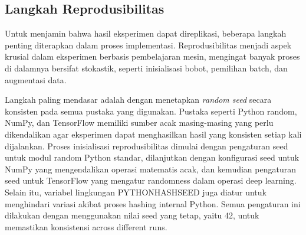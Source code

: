 \subsection{Langkah Reprodusibilitas}

Untuk menjamin bahwa hasil eksperimen dapat direplikasi, beberapa langkah penting diterapkan dalam proses implementasi. Reprodusibilitas menjadi aspek krusial dalam eksperimen berbasis pembelajaran mesin, mengingat banyak proses di dalamnya bersifat stokastik, seperti inisialisasi bobot, pemilihan batch, dan augmentasi data.

Langkah paling mendasar adalah dengan menetapkan \textit{random seed} secara konsisten pada semua pustaka yang digunakan. Pustaka seperti Python random, NumPy, dan TensorFlow memiliki sumber acak masing-masing yang perlu dikendalikan agar eksperimen dapat menghasilkan hasil yang konsisten setiap kali dijalankan. Proses inisialisasi reprodusibilitas dimulai dengan pengaturan seed untuk modul random Python standar, dilanjutkan dengan konfigurasi seed untuk NumPy yang mengendalikan operasi matematis acak, dan kemudian pengaturan seed untuk TensorFlow yang mengatur randomness dalam operasi deep learning. Selain itu, variabel lingkungan PYTHONHASHSEED juga diatur untuk menghindari variasi akibat proses hashing internal Python. Semua pengaturan ini dilakukan dengan menggunakan nilai seed yang tetap, yaitu 42, untuk memastikan konsistensi across different runs.
